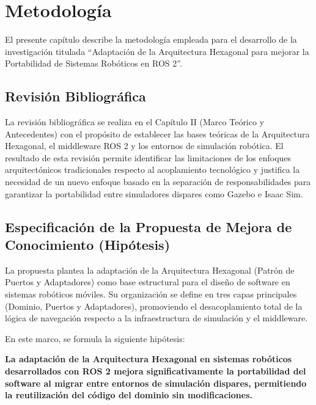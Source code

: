 \doublespacing

\chapter{Metodología}

El presente capítulo describe la metodología empleada para el desarrollo de la investigación titulada “Adaptación de la Arquitectura Hexagonal para mejorar la Portabilidad de Sistemas Robóticos en ROS 2”.

\section{Revisión Bibliográfica}

La revisión bibliográfica se realiza en el Capítulo II (Marco Teórico y Antecedentes) con el propósito de establecer las bases teóricas de la Arquitectura Hexagonal, el middleware ROS 2 y los entornos de simulación robótica. El resultado de esta revisión permite identificar las limitaciones de los enfoques arquitectónicos tradicionales respecto al acoplamiento tecnológico y justifica la necesidad de un nuevo enfoque basado en la separación de responsabilidades para garantizar la portabilidad entre simuladores dispares como Gazebo e Isaac Sim.

\section{Especificación de la Propuesta de Mejora de Conocimiento (Hipótesis)}

La propuesta plantea la adaptación de la Arquitectura Hexagonal (Patrón de Puertos y Adaptadores) como base estructural para el diseño de software en sistemas robóticos móviles. Su organización se define en tres capas principales (Dominio, Puertos y Adaptadores), promoviendo el desacoplamiento total de la lógica de navegación respecto a la infraestructura de simulación y el middleware.

En este marco, se formula la siguiente hipótesis:

\textbf{La adaptación de la Arquitectura Hexagonal en sistemas robóticos desarrollados con ROS 2 mejora significativamente la portabilidad del software al migrar entre entornos de simulación dispares, permitiendo la reutilización del código del dominio sin modificaciones.}


